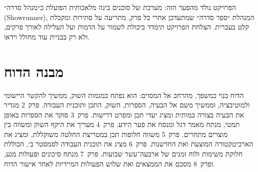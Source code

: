 \begin{directornote}
הפרויקט נולד מהפער הזה: מערכת של סוכנים בינה מלאכותית הפועלת כ״מנהל סדרה״ (\textenglish{Showrunner}), המנהלת ״ספר סדרה״ שמתעדכן אחרי כל פרק, מתריעה על סתירות ומקבלת קלט בעברית. הצלחת הפרויקט תימדד ביכולת לשמור על הדמות ועל העלילה לאורך פרקים, ולא רק בבניית עוד מחולל וידאו.
\end{directornote}

\section{מבנה הדוח}
הדוח בנוי כמשפך, מהרחב אל המסוים: הוא נפתח במגמות השוק, ממשיך להקשר היישומי ולמוטיבציה, וממשיך משם אל הבעיה, הספרות, השוק, התכן ותוכנית העבודה. פרק~2 מגדיר את הבעיה בצורה כמותית ומציג יעדי תכן ומפרט דרישות. פרק~3 סוקר את הספרות באופן תמטי, מנתח מאמר דגל ומנסח את פער הידע. פרק~4 מעריך את היקף השוק ומשווה בין מוצרים מתחרים. פרק~5 משווה חלופות תכן במטריצת החלטה משוקללת, ומציג את הארכיטקטורה המוצעת ואת החדשנות. פרק~6 מציג את תוכנית העבודה לסמסטר ב׳, הכוללת חלוקת משימות ולוח זמנים של ארבעה־עשר שבועות. פרק~7 מנתח סיכונים ופעולות מנע, ופרק~8 מסכם את הממצאים ואת שלוש הפעולות המיידיות לאחר אישור הדוח.
